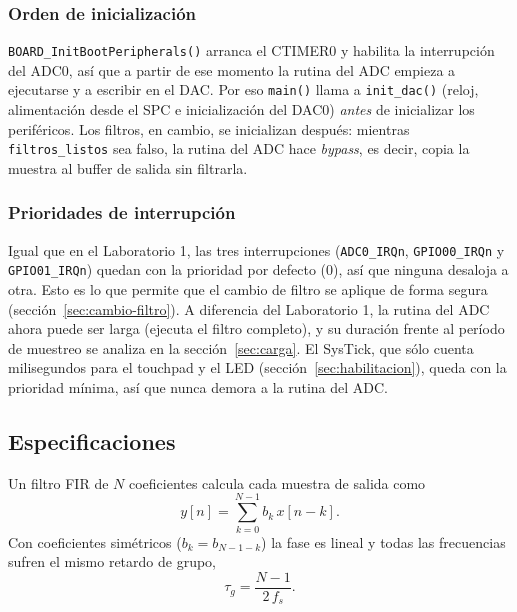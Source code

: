 \documentclass[11pt,a4paper]{article}
\begin{document}
\subsubsection{Orden de inicialización}

\texttt{BOARD\_InitBootPeripherals()} arranca el CTIMER0 y habilita la
interrupción del ADC0, así que a partir de ese momento la rutina del ADC
empieza a ejecutarse y a escribir en el DAC. Por eso \texttt{main()} llama a
\texttt{init\_dac()} (reloj, alimentación desde el SPC e inicialización del
DAC0) \emph{antes} de inicializar los periféricos. Los filtros, en cambio, se
inicializan después: mientras \texttt{filtros\_listos} sea falso, la rutina
del ADC hace \emph{bypass}, es decir, copia la muestra al buffer de salida
sin filtrarla.

\subsubsection{Prioridades de interrupción}

Igual que en el Laboratorio 1, las tres interrupciones (\texttt{ADC0\_IRQn},
\texttt{GPIO00\_IRQn} y \texttt{GPIO01\_IRQn}) quedan con la prioridad por
defecto (0), así que ninguna desaloja a otra. Esto es lo que permite que el
cambio de filtro se aplique de forma segura (sección~\ref{sec:cambio-filtro}).
A diferencia del Laboratorio 1, la rutina del ADC ahora puede ser larga
(ejecuta el filtro completo), y su duración frente al período de muestreo se
analiza en la sección~\ref{sec:carga}. El SysTick, que sólo cuenta
milisegundos para el touchpad y el LED (sección~\ref{sec:habilitacion}),
queda con la prioridad mínima, así que nunca demora a la rutina del ADC.

\label{sec:filtros}

\subsection{Especificaciones}

Un filtro FIR de $N$ coeficientes calcula cada muestra de salida como
\begin{equation}
  y[n] = \sum_{k=0}^{N-1} b_k\, x[n-k].
  \label{eq:fir}
\end{equation}
Con coeficientes simétricos ($b_k = b_{N-1-k}$) la fase es lineal y todas las
frecuencias sufren el mismo retardo de grupo,
\begin{equation}
  \tau_g = \frac{N-1}{2\,f_s}.
  \label{eq:retardo}
\end{equation}
\end{document}
